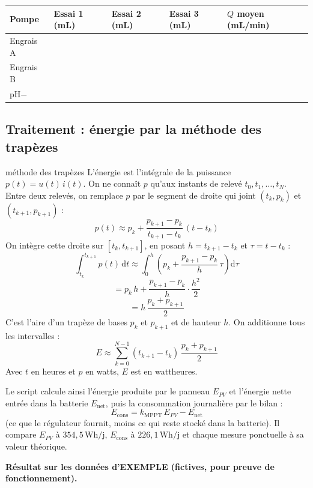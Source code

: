 \documentclass[11pt,a4paper]{article}
\newcommand{\U}[1]{\,\mathrm{#1}}
\begin{document}
\begin{center}
\begin{tabular}{|p{3.6cm}|p{2.4cm}|p{2.4cm}|p{2.4cm}|p{3cm}|}
\hline
\textbf{Pompe} & \textbf{Essai 1 (mL)} & \textbf{Essai 2 (mL)} & \textbf{Essai 3 (mL)} & \textbf{$Q$ moyen (mL/min)} \\
\hline
Engrais A & & & & \\[6pt]\hline
Engrais B & & & & \\[6pt]\hline
pH$-$ & & & & \\[6pt]\hline
\end{tabular}
\end{center}

\subsection{Traitement : énergie par la méthode des trapèzes}

\begin{demo}{méthode des trapèzes}
L'énergie est l'intégrale de la puissance $p(t) = u(t)\,i(t)$. On ne connaît $p$ qu'aux instants de relevé $t_0, t_1, \dots, t_N$. Entre deux relevés, on remplace $p$ par le segment de droite qui joint $(t_k, p_k)$ et $(t_{k+1}, p_{k+1})$ :
\[
p(t) \approx p_k + \frac{p_{k+1} - p_k}{t_{k+1} - t_k} \, (t - t_k)
\]
On intègre cette droite sur $[t_k, t_{k+1}]$, en posant $h = t_{k+1} - t_k$ et $\tau = t - t_k$ :
\[
\int_{t_k}^{t_{k+1}} p(t)\,\mathrm{d}t \approx \int_{0}^{h} \left( p_k + \frac{p_{k+1} - p_k}{h} \, \tau \right) \mathrm{d}\tau
\]
\[
= p_k \, h + \frac{p_{k+1} - p_k}{h} \cdot \frac{h^2}{2}
\]
\[
= h \, \frac{p_k + p_{k+1}}{2}
\]
C'est l'aire d'un trapèze de bases $p_k$ et $p_{k+1}$ et de hauteur $h$. On additionne tous les intervalles :
\[
E \approx \sum_{k=0}^{N-1} (t_{k+1} - t_k) \, \frac{p_k + p_{k+1}}{2}
\]
Avec $t$ en heures et $p$ en watts, $E$ est en wattheures.
\end{demo}

Le script calcule ainsi l'énergie produite par le panneau $E_{PV}$ et l'énergie nette entrée dans la batterie $E_{\text{net}}$, puis la consommation journalière par le bilan :
\[
E_{\text{cons}} = k_{\text{MPPT}} \, E_{PV} - E_{\text{net}}
\]
(ce que le régulateur fournit, moins ce qui reste stocké dans la batterie). Il compare $E_{PV}$ à $354{,}5\U{Wh/j}$, $E_{\text{cons}}$ à $226{,}1\U{Wh/j}$ et chaque mesure ponctuelle à sa valeur théorique.

\textbf{Résultat sur les données d'EXEMPLE (fictives, pour preuve de fonctionnement).}
\end{document}
